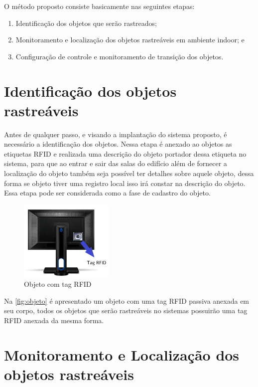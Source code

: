 \par
O método proposto consiste basicamente nas seguintes etapas:
\begin{enumerate}
    \item Identificação dos objetos que serão rastreados;
    \item Monitoramento e localização dos objetos rastreáveis em ambiente indoor; e
    \item Configuração de controle e monitoramento de transição dos objetos. 
\end{enumerate}

%
%
\section{Identificação dos objetos rastreáveis}

Antes de qualquer passo, e visando a implantação do sistema proposto, é necessário a identificação dos objetos. 
Nessa etapa é anexado ao objetos as etiquetas RFID e realizada uma descrição do objeto portador dessa etiqueta 
no sistema, para que ao entrar e sair das salas do edifício além de fornecer a localização do objeto também seja 
possível ter detalhes sobre aquele objeto, dessa forma se objeto tiver uma registro local isso irá constar na 
descrição do objeto. Essa etapa pode ser considerada como a fase de cadastro do objeto.

\begin{figure}[H]
              \caption{\label{fig:objeto}{Objeto com tag RFID}}
              \centering
              \includegraphics[width=0.4\textwidth]{Figuras/monitor.png}
\end{figure}
\par
Na \autoref{fig:objeto} é apresentado um objeto com uma tag RFID passiva anexada em seu corpo, todos os objetos que serão rastreáveis no sistemas possuirão uma tag RFID anexada da mesma forma.

%
\section{Monitoramento e Localização dos objetos rastreáveis}

